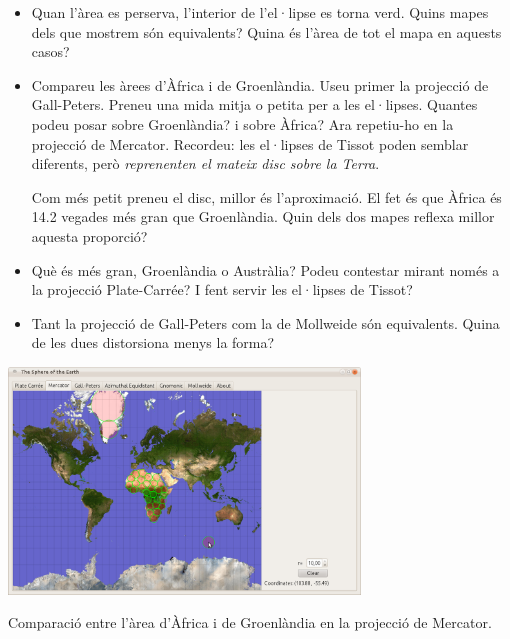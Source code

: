 \documentclass[a4paper,12pt]{article}
\begin{document}
\begin{itemize}
 \item Quan l'àrea es perserva, l'interior de l'el·lipse es torna verd. Quins mapes dels que mostrem són equivalents? Quina és l'àrea de tot el mapa en aquests casos?
 
 \item Compareu les àrees d'Àfrica i de Groenlàndia. Useu primer la projecció de Gall-Peters. Preneu una mida mitja o petita per a les el·lipses. Quantes podeu posar sobre Groenlàndia? i sobre Àfrica? Ara repetiu-ho en la projecció de Mercator. Recordeu: les el·lipses de Tissot poden semblar diferents, però \emph{reprenenten el mateix disc sobre la Terra}.
 
 Com més petit preneu el disc, millor és l'aproximació. El fet és que Àfrica és 14.2 vegades més gran que Groenlàndia. Quin dels dos mapes reflexa millor aquesta proporció?
 

 \item Què és més gran, Groenlàndia o Austràlia? Podeu contestar mirant només a la projecció Plate-Carrée? I fent servir les el·lipses de Tissot?

 \item Tant la projecció de Gall-Peters com la de Mollweide són equivalents. Quina de les dues distorsiona menys la forma?


\end{itemize}



 \begin{center}
  \includegraphics[width=0.7\textwidth]{merc1.png} 
  
{Comparació entre l'àrea d'Àfrica i de Groenlàndia en la projecció de Mercator.}
 \end{center}
\end{document}

